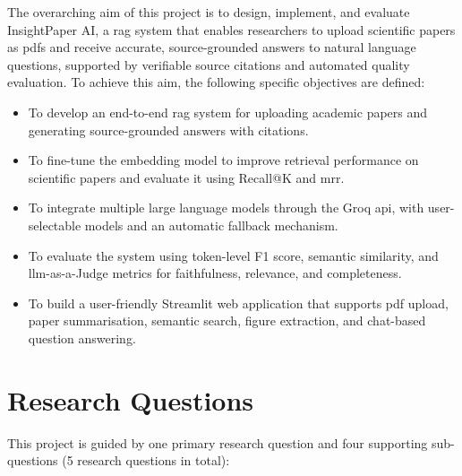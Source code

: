 




The overarching aim of this project is to design, implement, and evaluate InsightPaper AI, a \gls{rag} system that enables researchers to upload scientific papers as \gls{pdf}s and receive accurate, source-grounded answers to natural language questions, supported by verifiable source citations and automated quality evaluation. To achieve this aim, the following specific objectives are defined:

\begin{itemize}

\item To develop an end-to-end \gls{rag} system for uploading academic papers and generating source-grounded answers with citations.

\item To fine-tune the embedding model to improve retrieval performance on scientific papers and evaluate it using Recall@K and \gls{mrr}.

\item To integrate multiple large language models through the Groq \gls{api}, with user-selectable models and an automatic fallback mechanism.

\item To evaluate the system using token-level F1 score, semantic similarity, and \gls{llm}-as-a-Judge metrics for faithfulness, relevance, and completeness.

\item To build a user-friendly Streamlit web application that supports \gls{pdf} upload, paper summarisation, semantic search, figure extraction, and chat-based question answering.

\end{itemize}

\section{Research Questions}

This project is guided by one primary research question and four supporting sub-questions (5 research questions in total):

